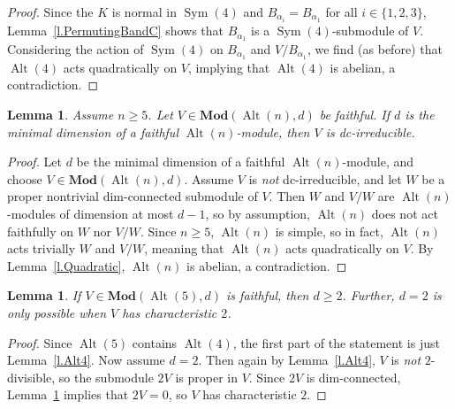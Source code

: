 \documentclass[a4paper, 11pt]{amsart}
\theoremstyle{plain}
\newtheorem{lemma}[theorem]{Lemma}
\theoremstyle{definition}
\theoremstyle{remark}
\DeclareMathOperator{\Sym}{Sym}
\DeclareMathOperator{\Alt}{Alt}
\newcommand{\Mod}{\mathbf{Mod}}
\begin{document}
\begin{proof}
Since the $K$ is normal in $\Sym(4)$ and $B_{\alpha_i} = B_{\alpha_1}$ for all $i\in \{1,2,3\}$, Lemma~\ref{l.PermutingBandC} shows that $B_{\alpha_1}$ is a $\Sym(4)$-submodule of $V$. Considering the action of $\Sym(4)$ on $B_{\alpha_1}$ and $V/B_{\alpha_1}$, we find (as before) that $\Alt(4)$ acts quadratically on $V$, implying that $\Alt(4)$ is abelian, a contradiction.
\end{proof}


\begin{lemma}\label{l.minimalAnIrreducible}
Assume $n\ge 5$. Let $V \in \Mod(\Alt(n), d)$ be faithful. If $d$ is the minimal dimension of a faithful $\Alt(n)$-module, then $V$ is dc-irreducible.%
\end{lemma}
\begin{proof}
Let $d$ be the minimal dimension of a faithful $\Alt(n)$-module, and choose $V \in \Mod(\Alt(n), d)$.  Assume $V$ is \emph{not} dc-irreducible, and let $W$ be a proper nontrivial dim-connected submodule of $V$. Then $W$ and $V/W$ are $\Alt(n)$-modules of dimension at most $d-1$, so by assumption, $\Alt(n)$ does not act faithfully on $W$ nor $V/W$. Since $n\ge 5$, $\Alt(n)$ is simple, so in fact, $\Alt(n)$ acts trivially  $W$ and $V/W$, meaning that $\Alt(n)$ acts quadratically on $V$. By Lemma~\ref{l.Quadratic}, $\Alt(n)$ is abelian, a contradiction.
\end{proof}

\begin{lemma}\label{l.Alt5}
If $V \in \Mod(\Alt(5), d)$ is faithful, then $d \ge 2$. Further, $d=2$ is only possible when $V$ has characteristic $2$. 
\end{lemma}
\begin{proof}
 Since $\Alt(5)$ contains $\Alt(4)$, the first part of the statement is just Lemma~\ref{l.Alt4}. Now assume $d=2$. Then again by Lemma~\ref{l.Alt4}, $V$ is \emph{not} $2$-divisible, so the submodule $2V$ is proper in $V$. Since $2V$ is dim-connected, Lemma~\ref{l.minimalAnIrreducible} implies that $2V = 0$, so $V$ has characteristic $2$.
\end{proof}
\end{document}
